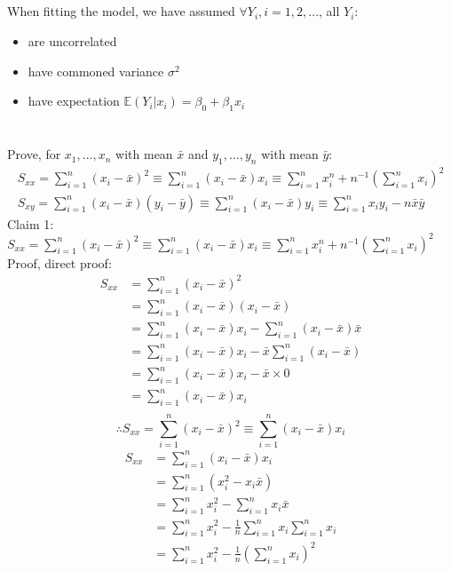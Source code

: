 \documentclass[a4paper]{article}
\begin{document}
	\subsection{}
		When fitting the model, we have assumed \(\forall Y_i, i = 1,2,...\), all \(Y_i\):
			\begin{itemize}
				\item are uncorrelated
				\item have commoned variance \(\sigma^2\)
				\item have expectation \(\mathbb{E}(Y_i|x_i) = \beta_0 + \beta_1x_i\)
			\end{itemize}

\newpage
\section{}
	Prove, for \(x_1, ..., x_n\) with mean \(\bar{x}\) and \(y_1, ..., y_n\) with mean \(\bar{y}\):
	\[
		\begin{split}
			S_{xx} = \sum_{i=1}^n(x_i-\bar{x})^2 \equiv \sum_{i=1}^n(x_i-\bar{x})x_i \equiv \sum_{i=1}^nx_i^n + n^{-1}\left(\sum_{i=1}^nx_i\right)^2\\
			S_{xy} = \sum_{i=1}^n(x_i-\bar{x})(y_i-\bar{y}) \equiv \sum_{i=1}^n (x_i - \bar{x})y_i \equiv \sum_{i=1}^nx_iy_i - n\bar{x}\bar{y}
		\end{split}
	\]
		Claim 1: \(S_{xx} = \sum_{i=1}^n(x_i-\bar{x})^2 \equiv \sum_{i=1}^n(x_i-\bar{x})x_i \equiv \sum_{i=1}^nx_i^n + n^{-1}\left(\sum_{i=1}^nx_i\right)^2\)\\
		Proof, direct proof:
			\begin{equation*}
				\begin{split}
					S_{xx} &= \sum_{i=1}^n(x_i-\bar{x})^2\\
					&= \sum_{i=1}^n(x_i-\bar{x})(x_i-\bar{x})\\
					&= \sum_{i=1}^n(x_i-\bar{x})x_i - \sum_{i=1}^n(x_i-\bar{x})\bar{x}\\
					&= \sum_{i=1}^n(x_i-\bar{x})x_i - \bar{x}\sum_{i=1}^n(x_i-\bar{x})\\
					&= \sum_{i=1}^n(x_i-\bar{x})x_i - \bar{x}\times 0\\
					&= \sum_{i=1}^n(x_i-\bar{x})x_i\\
				\end{split}
			\end{equation*}
			\[\therefore S_{xx} = \sum_{i=1}^n(x_i-\bar{x})^2 \equiv \sum_{i=1}^n(x_i-\bar{x})x_i\]
			\begin{equation*}
				\begin{split}
					S_{xx} &= \sum_{i=1}^n(x_i-\bar{x})x_i\\
					&= \sum_{i=1}^n \left(x_i^2 - x_i\bar{x}\right)\\
					&= \sum_{i=1}^n x_i^2 - \sum_{i=1}^nx_i\bar{x}\\
					&= \sum_{i=1}^n x_i^2 - \frac{1}{n}\sum_{i=1}^nx_i\sum_{i=1}^nx_i\\
					&= \sum_{i=1}^n x_i^2 - \frac{1}{n}\left(\sum_{i=1}^nx_i\right)^2
				\end{split}
			\end{equation*}
\end{document}
